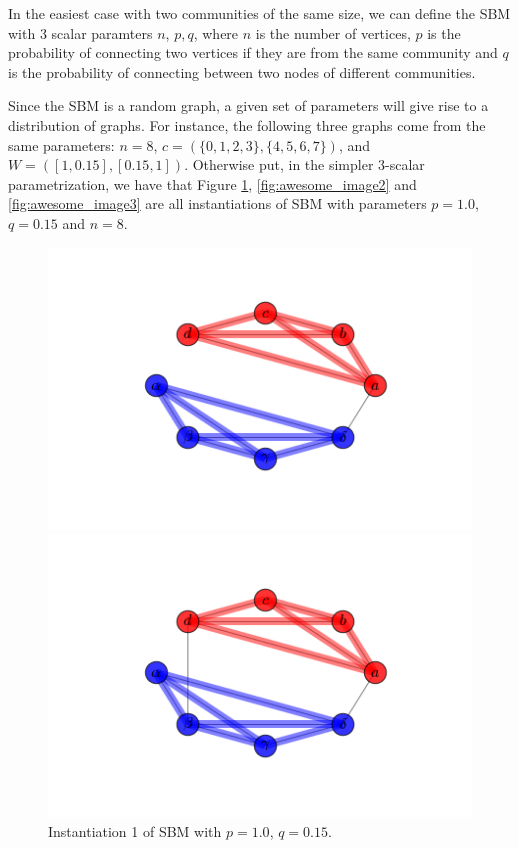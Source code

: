In the easiest case with two communities of the same size, we can define the SBM with 3 scalar paramters $n$, $p, q$, where $n$ is the number of vertices, $p$ is the probability of connecting two vertices if they are from the same community and $q$ is the probability of connecting between two nodes of different communities. 


Since the SBM is a random graph, a given set of parameters will give rise to a distribution of graphs.  For instance, the following three graphs come from the same parameters: $n = 8$, $c = (\{0,1,2,3\}, \{4,5,6,7\})$, and $W =([1,0.15],[0.15,1])$. Otherwise put, in the simpler $3$-scalar parametrization, we have that Figure \ref{fig:awesome_image1}, \ref{fig:awesome_image2} and \ref{fig:awesome_image3} are all instantiations of SBM with parameters $p=1.0$, $q=0.15$ and $n=8$.  
\begin{figure}[h]
  \includegraphics[width=\linewidth]{labels_and_colors_1.png}
  \caption{Instantiation 1 of SBM with $p=1.0$, $q=0.15$.}\label{fig:awesome_image1}
\endminipage\hfill
{}
  \includegraphics[width=\linewidth]{labels_and_colors_2.png}

\end{figure}
